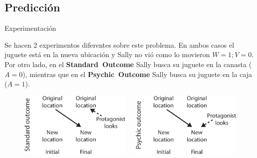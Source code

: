 \documentclass{beamer}
\begin{document}
\subsection{Predicción}
\begin{frame}[fragile]{Experimentación}

Se hacen 2 experimentos diferentes sobre este problema. En ambos casos el juguete está en la nueva ubicación y Sally no vió como lo movieron \( W = 1; V = 0 \). Por otro lado, en el \textbf{Standard~Outcome} Sally busca su juguete en la canasta (\( A = 0 \)), mientras que en el \textbf{Psychic~Outcome} Sally busca su juguete en la caja (\( A = 1 \)).

\begin{figure}
\begin{columns}
\begin{column}{.5\textwidth}
\includegraphics[width=\textwidth]{imagenes/standard_outcome.png}
\end{column}
\begin{column}{.5\textwidth}
\includegraphics[width=\textwidth]{imagenes/psychic_outcome.png}
\end{column}
\end{columns}
\label{outcome}
\end{figure}

\end{frame}
\end{document}
